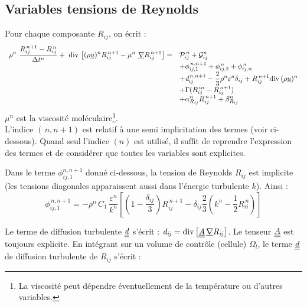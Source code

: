\subsection*{\bf Variables tensions de Reynolds}
Pour chaque composante $R_{ij}$, on \'ecrit :
\begin{equation}\label{Base_Turrij_Eq_Temp_Rij}
\begin{array}{ll}
\displaystyle
\rho^n\ \frac {R_{ij}^{\,n+1}-R_{ij}^{\,n}}{\Delta t^n}
+\ \text{div}\,\left[ (\rho \underline{u})^{n} R_{ij}^{\,n+1}
- \mu^n\ \underline{\nabla}{R}_{ij}^{\,n+1} \right]
=  &
\displaystyle
\mathcal{P}^{\,n}_{ij}
+ \mathcal{G}^n_{ij} \\
&
\displaystyle
+ \phi^{\,n,n+1}_{ij,1} + \phi^{\,n}_{ij,2} + \phi^{\,n}_{ij,w} \\
&
\displaystyle
+ \text{\it{d}}^{\,n,n+1}_{ij}
- \displaystyle \frac{2}{3} \rho^n \varepsilon^n \delta_{ij}
+ R^{\,n+1}_{ij} \text{div}\,{(\rho \underline{u})^n} \\
&
\displaystyle
+ \Gamma(R^{\,in}_{ij} - R^{\,n+1}_{ij}) \\
&
\displaystyle
+ \alpha^n_{R_{ij}} R^{\,n+1}_{ij} + \beta^n_{R_{ij}}
\end{array}
\end{equation}
$\mu^n$ est la viscosit\'e mol\'eculaire\footnote{La viscosit\'e peut
d\'ependre \'eventuellement de la temp\'erature ou d'autres variables.}.\\
L'indice $(\,n,n+1)$ est relatif \`a une semi implicitation des termes (voir ci-dessous). Quand seul l'indice $(n)$ est utilis\'e, il suffit de reprendre l'expression des termes et de consid\'erer que toutes les variables sont explicites.

Dans le terme $\phi^{n,n+1}_{ij,1}$ donn\'e ci-dessous, la tension de Reynolds
 $R_{ij}$ est implicite (les tensions diagonales apparaissent aussi dans l'\'energie
turbulente $k$). Ainsi :
\begin{equation}
\displaystyle
\phi^{\,n,n+1}_{ij,1} = -\rho^n \,C_1\,\frac{\varepsilon^n}{k^n}\left[
(1-\frac{\delta_{ij}}{3}) R^{\,n+1}_{ij}- \delta_{ij} \frac{2}{3} (k^n-\frac{1}{2} R^{\,n}_{ii}) \right]
\end{equation}

Le terme de diffusion turbulente $\underline{\underline{\it{d}}}$ s'\'ecrit : $\it{d}_{ij} = \text{div}\,{\left[ \underline{\underline{A}}\,\underline{\nabla}{R}_{ij} \right]}$.
Le tenseur $\underline{\underline{A}}$ est toujours explicite.
En int\'egrant sur un volume de contr\^ole (cellule) $\Omega_l$, le terme $\underline{\underline{\it{d}}}$ de diffusion turbulente de $R_{ij}$ s'\'ecrit :

